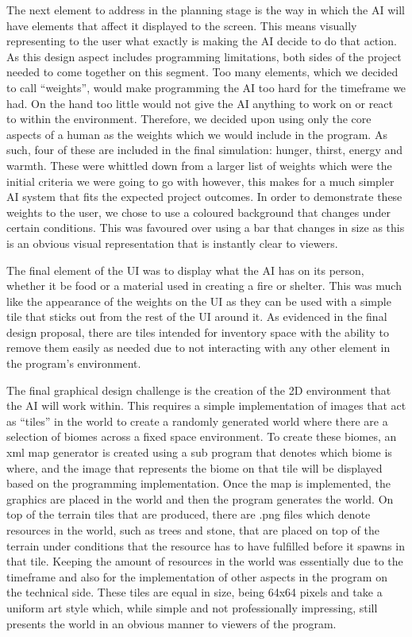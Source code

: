 \documentclass[a4paper]{report}
\begin{document}
The next element to address in the planning stage is the way in which the AI will have elements that affect it displayed to the screen. This means visually representing to the user what exactly is making the AI decide to do that action. As this design aspect includes programming limitations, both sides of the project needed to come together on this segment. Too many elements, which we decided to call “weights”, would make programming the AI too hard for the timeframe we had. On the hand too little would not give the AI anything to work on or react to within the environment. Therefore, we decided upon using only the core aspects of a human as the weights which we would include in the program. As such, four of these are included in the final simulation: hunger, thirst, energy and warmth. These were whittled down from a larger list of weights which were the initial criteria we were going to go with however, this makes for a much simpler AI system that fits the expected project outcomes. In order to demonstrate these weights to the user, we chose to use a coloured background that changes under certain conditions. This was favoured over using a bar that changes in size as this is an obvious visual representation that is instantly clear to viewers.

The final element of the UI was to display what the AI has on its person, whether it be food or a material used in creating a fire or shelter. This was much like the appearance of the weights on the UI as they can be used with a simple tile that sticks out from the rest of the UI around it. As evidenced in the final design proposal, there are tiles intended for inventory space with the ability to remove them easily as needed due to not interacting with any other element in the program's environment.

The final graphical design challenge is the creation of the 2D environment that the AI will work within. This requires a simple implementation of images that act as “tiles” in the world to create a randomly generated world where there are a selection of biomes across a fixed space environment. To create these biomes, an xml map generator is created using a sub program that denotes which biome is where, and the image that represents the biome on that tile will be displayed based on the programming implementation. Once the map is implemented, the graphics are placed in the world and then the program generates the world. On top of the terrain tiles that are produced, there are .png files which denote resources in the world, such as trees and stone, that are placed on top of the terrain under conditions that the resource has to have fulfilled before it spawns in that tile. Keeping the amount of resources in the world was essentially due to the timeframe and also for the implementation of other aspects in the program on the technical side. These tiles are equal in size, being 64x64 pixels and take a uniform art style which, while simple and not professionally impressing, still presents the world in an obvious manner to viewers of the program.
\end{document}
